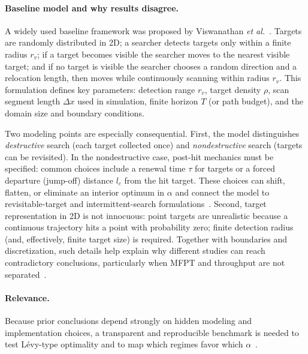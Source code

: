 \paragraph{Baseline model and why results disagree.}
A widely used baseline framework was proposed by Viswanathan \emph{et al.}~\cite{viswanathan1999optimizing}. Targets are randomly distributed in 2D; a searcher detects targets only within a finite radius $r_v$; if a target becomes visible the searcher moves to the nearest visible target; and if no target is visible the searcher chooses a random direction and a relocation length, then moves while continuously scanning within radius $r_v$. This formulation defines key parameters: detection range $r_v$, target density $\rho$, scan segment length $\Delta x$ used in simulation, finite horizon $T$ (or path budget), and the domain size and boundary conditions.

Two modeling points are especially consequential. First, the model distinguishes \emph{destructive} search (each target collected once) and \emph{nondestructive} search (targets can be revisited). In the nondestructive case, post-hit mechanics must be specified: common choices include a renewal time $\tau$ for targets or a forced departure (jump-off) distance $l_c$ from the hit target. These choices can shift, flatten, or eliminate an interior optimum in $\alpha$ and connect the model to revisitable-target and intermittent-search formulations~\cite{benichou2006twodimensional,benichou2011intermittent,lomholt2008levy,santos2004optimal}. Second, target representation in 2D is not innocuous: point targets are unrealistic because a continuous trajectory hits a point with probability zero; finite detection radius (and, effectively, finite target size) is required. Together with boundaries and discretization, such details help explain why different studies can reach contradictory conclusions, particularly when MFPT and throughput are not separated~\cite{james2011assessing,levernier2020inverse,plank2008optimal}.

\paragraph{Relevance.}
Because prior conclusions depend strongly on hidden modeling and implementation choices, a transparent and reproducible benchmark is needed to test Lévy-type optimality and to map which regimes favor which $\alpha$~\cite{edwards2007revisiting,james2011assessing,plank2008optimal}.

